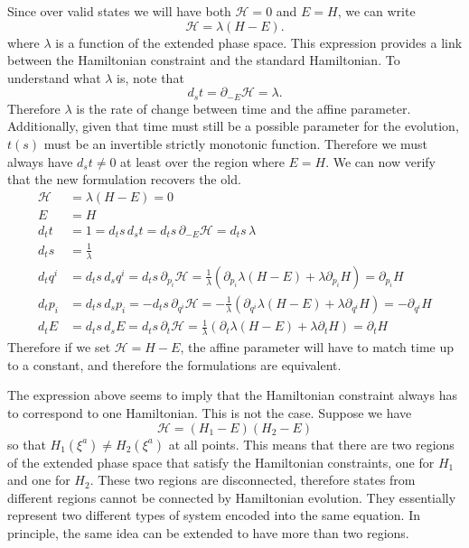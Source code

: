Since over valid states we will have both $\mathcal{H}=0$ and $E=H$, we can write
\begin{equation}
	\mathcal{H} = \lambda (H - E).
\end{equation}
where $\lambda$ is a function of the extended phase space. This expression provides a link between the Hamiltonian constraint and the standard Hamiltonian. To understand what $\lambda$ is, note that
\begin{equation}
	d_s t =  \partial_{-E} \mathcal{H} = \lambda.
\end{equation}
Therefore $\lambda$ is the rate of change between time and the affine parameter. Additionally, given that time must still be a possible parameter for the evolution, $t(s)$ must be an invertible strictly monotonic function. Therefore we must always have $d_s t \neq 0$ at least over the region where $E = H$. We can now verify that the new formulation recovers the old.
\begin{equation}
	\begin{aligned}
		\mathcal{H} &= \lambda(H - E) = 0 \\
		E &= H \\
		d_t t &= 1 = d_t s \, d_s t = d_t s \, \partial_{-E} \mathcal{H} = d_t s \,  \lambda \\
		d_t s &= \frac{1}{\lambda} \\ 
		d_t q^i &= d_t s \, d_s q^i = d_t s \, \partial_{p_i} \mathcal{H} = \frac{1}{\lambda} \left(\partial_{p_i} \lambda (H - E) + \lambda \partial_{p_i} H \right) = \partial_{p_i} H \\
		d_t p_i &= d_t s \, d_s p_i = - d_t s \, \partial_{q^i} \mathcal{H} = - \frac{1}{\lambda} \left(\partial_{q^i} \lambda (H - E) + \lambda \partial_{q^i} H \right) = - \partial_{q^i} H \\
		d_t E &= d_t s \, d_s E = d_t s \, \partial_{t} \mathcal{H} = \frac{1}{\lambda} \left(\partial_{t} \lambda (H - E) + \lambda \partial_{t} H \right) = \partial_t H
	\end{aligned}
\end{equation}
Therefore if we set $\mathcal{H} = H - E$, the affine parameter will have to match time up to a constant, and therefore the formulations are equivalent.

The expression above seems to imply that the Hamiltonian constraint always has to correspond to one Hamiltonian. This is not the case. Suppose we have
\begin{equation}
	\mathcal{H} = (H_1 - E) (H_2 - E)
\end{equation}
so that $H_1(\xi^a) \neq H_2(\xi^a)$ at all points. This means that there are two regions of the extended phase space that satisfy the Hamiltonian constraints, one for $H_1$ and one for $H_2$. These two regions are disconnected, therefore states from different regions cannot be connected by Hamiltonian evolution. They essentially represent two different types of system encoded into the same equation. In principle, the same idea can be extended to have more than two regions.

